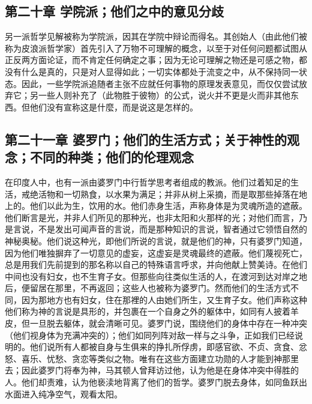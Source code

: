 
\subsection{第二十章 学院派；他们之中的意见分歧}

另一派哲学见解被称为学院派，因其在学院中辩论而得名。其创始人（由此他们被称为皮浪派哲学家）首先引入了万物不可理解的概念，以至于对任何问题都试图从正反两方面论证，而不肯定任何确定之事；因为无论可理解之物还是可感之物，都没有什么是真的，只是对人显得如此；一切实体都处于流变之中，从不保持同一状态。因此，一些学院派追随者主张不应就任何事物的原理发表意见，而仅仅尝试放弃它；另一些人则补充了（此物胜于彼物）的公式，说火并不更是火而非其他东西。但他们没有宣称这是什麼，而是说这是怎样的。\par


\subsection{第二十一章 婆罗门；他们的生活方式；关于神性的观念；不同的种类；他们的伦理观念}

在印度人中，也有一派由婆罗门中行哲学思考者组成的教派。他们过着知足的生活，戒绝活物和一切熟食，以水果为满足；并非从树上采摘，而是取那些掉落在地上的。他们以此为生，饮用的水。他们赤身生活，声称身体是为灵魂所造的遮蔽。他们断言是光，并非人们所见的那种光，也非太阳和火那样的光；对他们而言，乃是言说，不是发出可闻声音的言说，而是那种知识的言说，智者通过它领悟自然的神秘奥秘。他们说这种光，即他们所说的言说，就是他们的神，只有婆罗门知道，因为他们唯独摒弃了一切意见的虚妄，这虚妄是灵魂最终的遮蔽。他们蔑视死亡，总是用我们先前提到的那名称以自己的特殊语言呼求，并向他献上赞美诗。在他们中间也没有妇女，也不生育子女。但那些向往类似生活的人，在渡河到达对岸之地后，便留居在那里，不再返回；这些人也被称为婆罗门。然而他们的生活方式不同，因为那地方也有妇女，住在那裡的人由她们所生，又生育子女。他们声称这种他们称为神的言说是具形的，并包裹在一个自身之外的躯体中，如同有人披着羊皮，但一旦脱去躯体，就会清晰可见。婆罗门说，围绕他们的身体中存在一种冲突（他们视身体为充满冲突的）；他们如同列阵对敌一样与之斗争，正如我们已经说明的。他们说所有人都被自身与生俱来的挣扎所俘虏，即感官欲、不贞、贪食、忿怒、喜乐、忧愁、贪恋等类似之物。唯有在这些方面建立功勋的人才能到神那里去；因此婆罗门将奉为神，马其顿人曾拜访过他，认为他是在身体冲突中得胜的人。他们却责难，认为他亵渎地背离了他们的哲学。婆罗门脱去身体，如同鱼跃出水面进入纯净空气，观看太阳。\par

